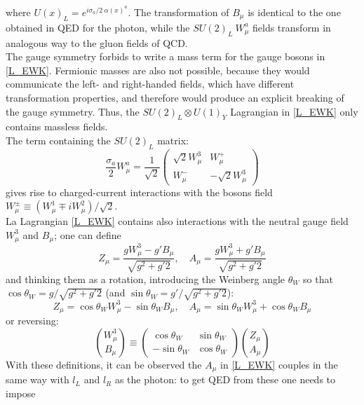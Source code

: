 where $U(x)_{L} = e^{i\sigma_{a} / 2\ \alpha(x)^{a}}$. The transformation of $B_{\mu}$ is identical to the one obtained in QED for the photon, while the $SU(2)_{L}\ W^{a}_{\mu}$ fields transform in analogous way to the gluon fields of QCD. \\
The gauge symmetry forbids to write a mass term for the gauge bosons in \ref{L_EWK}. Fermionic masses are also not possible, because they would communicate the left- and right-handed fields, which have different transformation properties, and therefore would produce an explicit breaking of the gauge symmetry. Thus, the $SU(2)_{L} \otimes U(1)_{Y}$ Lagrangian in \ref{L_EWK} only contains massless fields.\\
The term containing the $SU(2)_{L}$ matrix:
\begin{equation}
\frac{\sigma_{a}}{2}W_{\mu}^{a} = \frac{1}{\sqrt{2}}\begin{pmatrix} \sqrt{2}W^{3}_{\mu} & W_{\mu}^{+} \\ W_{\mu}^{-} & - \sqrt{2}W^{3}_{\mu} \end{pmatrix}
\end{equation}
gives rise to charged-current interactions with the bosons field $W_{\mu}^{\pm} \equiv (W^{1}_{\mu} \mp iW^{2}_{\mu}) / \sqrt{2}$. \\
La Lagrangian \ref{L_EWK}  contains also interactions with the neutral gauge field $W^{3}_{\mu}$ and $B_{\mu}$; one can define
\begin{equation}
Z_{\mu} = \frac{gW^{3}_{\mu} - g'B_{\mu}}	{\sqrt{g^{2}+g'{2}}}, \quad A_{\mu} = \frac{gW^{3}_{\mu} + g'B_{\mu}}	{\sqrt{g^{2}+g'{2}}}
\label{A_Z}
\end{equation}
and thinking them as a rotation, introducing the Weinberg angle $\theta_{W}$ so that $\cos\theta_{W} = g/{\sqrt{g^{2}+g'{2}}}$ (and $\sin\theta_{W} = g'/{\sqrt{g^{2}+g'{2}}}$):
\begin{equation}
Z_{\mu} = \cos\theta_{W}W^{3}_{\mu} - \sin\theta_{W}B_{\mu}, \quad A_{\mu} = \sin\theta_{W}W^{3}_{\mu} + \cos\theta_{W}B_{\mu}
\label{A_Z_2}
\end{equation}
or reversing:
\begin{equation}
{W^{3}_{\mu} \choose B_{\mu}} \equiv \begin{pmatrix} \cos\theta_{W} & \sin\theta_{W} \\ -\sin\theta_{W} & \cos\theta_{W} \end{pmatrix} {Z_{\mu} \choose A_{\mu}}
\label{W_B_A_Z}
\end{equation}
With these definitions, it can be observed the $A_{\mu}$ in \ref{L_EWK} couples in the same way with $l_{L}$ and $l_{R}$ as the photon: to get QED from these one needs to impose
